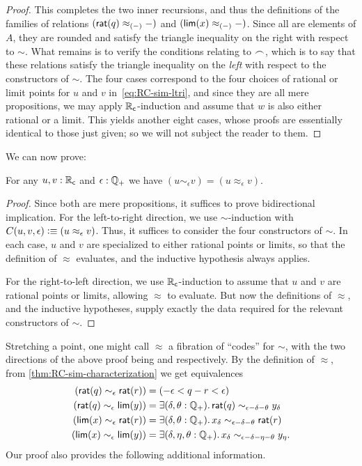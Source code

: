\begin{proof}
  This completes the two inner recursions, and thus the definitions of the families of relations $(\mathsf{rat}(q)\approx_{(-)}-)$ and $(\mathsf{lim}(x)\approx_{(-)}-)$.
  Since all are elements of $A$, they are rounded and satisfy the triangle inequality on the right with respect to $\sim$.
  What remains is to verify the conditions relating to $\frown$, which is to say that these relations satisfy the triangle inequality on the \emph{left} with respect to the constructors of $\sim$.
  The four cases correspond to the four choices of rational or limit points for $u$ and $v$ in~\eqref{eq:RC-sim-ltri}, and since they are all mere propositions, we may apply $\mathbb{R}_\mathsf{c}$-induction and assume that $w$ is also either rational or a limit.
  This yields another eight cases, whose proofs are essentially identical to those just given; so we will not subject the reader to them.
\end{proof}

We can now prove:

\begin{thm}\label{thm:RC-sim-characterization}
  For any $u,v:\mathbb{R}_\mathsf{c}$ and $\epsilon:\mathbb{Q}_{+}$ we have $(u\sim_\epsilon v) = (u\approx_\epsilon v)$.
\end{thm}
\begin{proof}
  Since both are mere propositions, it suffices to prove bidirectional implication.
  For the left-to-right direction, we use $\sim$-induction with $C(u,v,\epsilon)\vcentcolon\equiv (u\approx_\epsilon v)$.
  Thus, it suffices to consider the four constructors of $\sim$.
  In each case, $u$ and $v$ are specialized to either rational points or limits, so that the definition of $\approx$ evaluates, and the inductive hypothesis always applies.

  For the right-to-left direction, we use $\mathbb{R}_\mathsf{c}$-induction to assume that $u$ and $v$ are rational points or limits, allowing $\approx$ to evaluate.
  But now the definitions of $\approx$, and the inductive hypotheses, supply exactly the data required for the relevant constructors of $\sim$.
\end{proof}

Stretching a point, one might call $\approx$ a fibration of ``codes'' for $\sim$, with the two directions of the above proof being \encode and \decode respectively.
By the definition of $\approx$, from \autoref{thm:RC-sim-characterization} we get equivalences
\begin{align*}
  (\rcrat(q) \sim_\epsilon \rcrat(r))  &=
  (-\epsilon < q - r < \epsilon)\\
  (\rcrat(q) \sim_\epsilon \rclim(y)) &=
  \exis{\delta, \theta : \Qp} \rcrat(q) \sim_{\epsilon - \delta - \theta} y_\delta\\
  (\rclim(x) \sim_\epsilon \rcrat(r)) &=
  \exis{\delta, \theta : \Qp} x_\delta \sim_{\epsilon - \delta - \theta} \rcrat(r)\\
  (\rclim(x) \sim_\epsilon \rclim(y)) &=
  \exis{\delta, \eta, \theta : \Qp} x_\delta \sim_{\epsilon - \delta - \eta - \theta} y_\eta.
\end{align*}
Our proof also provides the following additional information.

